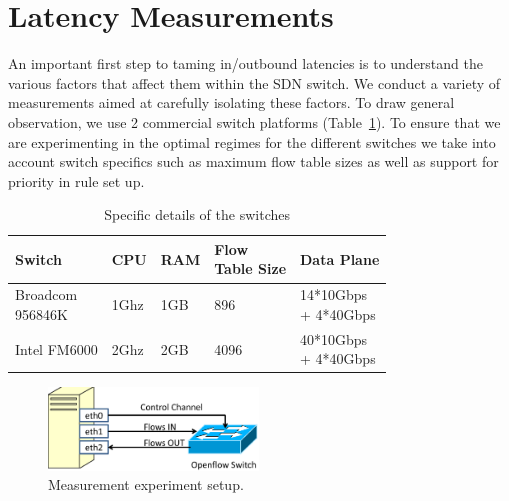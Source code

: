 \section{Latency Measurements}\label{sec-measure}


An important first step to taming in/outbound latencies is to
understand the various factors that affect them 
within the SDN switch. We conduct a variety of measurements aimed at
carefully isolating these factors. To draw general observation, we use
2 commercial switch platforms (Table~\ref{switch_para}).
To ensure that we are experimenting in the optimal regimes for the different
switches we take into account switch specifics such as maximum flow table sizes
as well as support for priority in rule set up. 
\begin{table}
\centering
\small
\begin{tabular}{|l|l|l|l|l|}
\hline
Switch & CPU & RAM & \tabincell{c}{Flow \\Table Size} & Data Plane \\ \hline
\tabincell{c}{Broadcom \\956846K} & 1Ghz & 1GB & 896 & \tabincell{c}{14*10Gbps \\+ 4*40Gbps}\\ \hline
Intel FM6000 & 2Ghz & 2GB & 4096 & \tabincell{c}{40*10Gbps \\+ 4*40Gbps} \\ \hline
\end{tabular}
\caption{Specific details of the switches}{\label{switch_para}}
\end{table}



\begin{figure}[!tb]
\centering
\includegraphics[width=2.2in]{figs/experiment_setup.eps}
\caption{Measurement experiment setup. }\label{experiment_setup} 
\end{figure}

